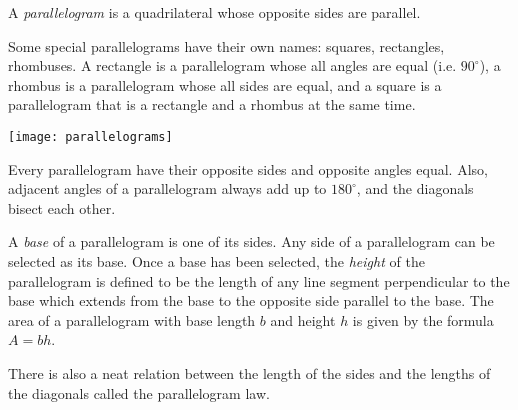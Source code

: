 \documentclass{article}
\begin{document}
A {\em parallelogram} is a quadrilateral whose opposite sides are parallel.

Some special parallelograms have their own names: squares, rectangles, rhombuses.
A rectangle is a parallelogram whose all angles are equal (i.e. $90^\circ$), a rhombus is a parallelogram whose all sides are equal, and a square is a parallelogram that is a rectangle and a rhombus at the same time.

\texttt{[image: parallelograms]}

Every parallelogram have their opposite sides and opposite angles equal. Also, adjacent angles of a parallelogram always add up to $180^\circ$, and the diagonals bisect each other.

A \emph{base} of a parallelogram is one of its sides.  Any side of a
parallelogram can be selected as its base.  Once a base has been
selected, the \emph{height} of the parallelogram is defined to be the
length of any line segment perpendicular to the base which extends
from the base to the opposite side parallel to the base.  The area of
a parallelogram with base length $b$ and height $h$ is given by the
formula  \,$A = bh$.

There is also a neat relation between the length of the sides and the lengths of the diagonals called the parallelogram law.

\end{document}
